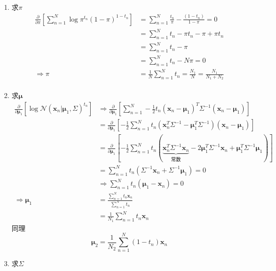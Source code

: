 \begin{enumerate}
	\item 求$\pi$
	\begin{equation}
	\begin{aligned}
	\frac{\partial }{\partial\pi}\left[\sum\limits_{n=1}^{N}\log \pi^{t_n}(1-\pi)^{1-t_n} \right]&=\sum_{n=1}^{N}\frac{t_n}{\pi}-\frac{(1-t_n)}{1-\pi}=0\\
	&=\sum_{n=1}^{N}t_n-\pi t_n -\pi +\pi t_n\\
	&=\sum_{n=1}^{N}t_n-\pi\\
	&=\sum_{n=1}^{N}t_n-N\pi=0\\
	\Rightarrow \pi &= \frac{1}{N}\sum_{n=1}^{N}t_n=\frac{N_1}{N}=\frac{N_1}{N_1+N_2}\\
	\end{aligned}
	\end{equation}
	
	\item 求$\boldsymbol{\mu}$
	\begin{equation}
		\begin{aligned}
		\frac{\partial }{\partial \boldsymbol{\mu}_1}\left[\log \mathcal{N}(\boldsymbol{x}_n|\boldsymbol{\mu}_1,\Sigma)^{t_n}\right]&\Rightarrow \frac{\partial }{\partial \boldsymbol{\mu}_1}\left[\sum_{n=1}^{N}-\frac{1}{2}t_n(\boldsymbol{x}_n-\boldsymbol{\mu}_1)^T\Sigma^{-1}(\boldsymbol{x}_n-\boldsymbol{\mu}_1) \right]\\
		&=\frac{\partial }{\partial \boldsymbol{\mu}_1}\left[-\frac{1}{2}\sum_{n=1}^{N}t_n(\boldsymbol{x}_n^T\Sigma^{-1}-\boldsymbol{\mu}_1^T\Sigma^{-1})(\boldsymbol{x}_n-\boldsymbol{\mu}_1) \right]\\
		&=\frac{\partial }{\partial \boldsymbol{\mu}_1}\left[-\frac{1}{2}\sum_{n=1}^{N}t_n(\underbrace{\boldsymbol{x}_n^T\Sigma^{-1}\boldsymbol{x}_n}_{\text{常数}} - 2\boldsymbol{\mu}_1^T\Sigma^{-1}\boldsymbol{x}_n+\boldsymbol{\mu}_1^T\Sigma^{-1}\boldsymbol{\mu}_1) \right]\\
		&=\sum_{n=1}^{N}t_n(\Sigma^{-1}\boldsymbol{x}_n+\Sigma^{-1}\boldsymbol{\mu}_1)=0\\
		&\Rightarrow\sum_{n=1}^{N}t_n(\boldsymbol{\mu}_1-\boldsymbol{x}_n)=0\\
		\Rightarrow \boldsymbol{\mu}_1&=\frac{\sum\limits_{n=1}^{N}t_n\boldsymbol{x}_n}{\sum\limits_{n=1}^{N}t_n}\\
		&=\frac{1}{N_1}\sum\limits_{n=1}^{N}t_n\boldsymbol{x}_n
		\end{aligned}
	\end{equation}
	同理
	\begin{equation}
		\boldsymbol{\mu}_2=\frac{1}{N_2}\sum_{n=1}^{N}(1-t_n)\boldsymbol{x}_n
	\end{equation}
	\item 求$\Sigma$
	

\end{enumerate}
